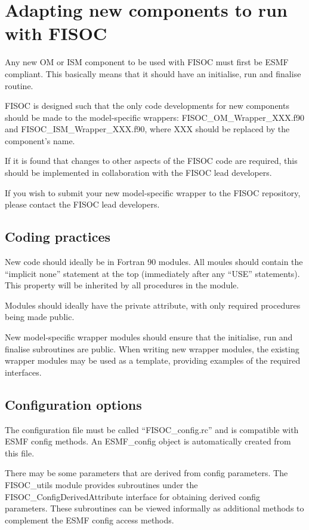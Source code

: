 \documentclass[12pt]{article}
\begin{document}
\section{Adapting new components to run with  FISOC}
\label{sec:FISOC_SDG}

Any new OM or ISM component to be used with FISOC must first be ESMF compliant.  This basically 
means that it should have an initialise, run and finalise routine. 

FISOC is designed such that the only code developments for new components should be made to the 
model-specific wrappers: FISOC\_OM\_Wrapper\_XXX.f90 and FISOC\_ISM\_Wrapper\_XXX.f90, where 
XXX should be replaced by the component's name.

If it is found that changes to other aspects of the FISOC code are required, this should be 
implemented in collaboration with the FISOC lead developers.

If you wish to submit your new model-specific wrapper to the FISOC repository, please contact 
the FISOC lead developers.


\subsection{Coding practices}

New code should ideally be in Fortran 90 modules.  
All moules should contain the ``implicit none'' statement at the top (immediately after any 
``USE'' statements).  This property will be inherited by all procedures in the module.

Modules should ideally have the private attribute, with only required procedures being 
made public. 

New model-specific wrapper modules should ensure that the initialise, run and finalise 
subroutines are public. 
When writing new wrapper modules, the existing wrapper modules may be used as a template, 
providing examples of the required interfaces.


\subsection{Configuration options}

The configuration file must be called ``FISOC_config.rc'' and is compatible with ESMF 
config methods.  
An ESMF\_config object is automatically created from this file.

There may be some parameters that are derived from config parameters.  
The FISOC\_utils module provides subroutines under the 
FISOC\_ConfigDerivedAttribute interface 
for obtaining derived config parameters.
These subroutines can be viewed informally as additional methods to complement the ESMF config access methods. 
\end{document}
